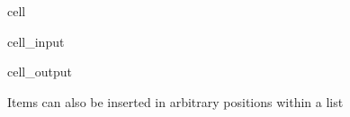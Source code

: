 \documentclass[letterpaper,10pt,english]{jupyterBook}
\begin{document}
\begin{sphinxuseclass}{cell}\begin{sphinxVerbatimInput}

\begin{sphinxuseclass}{cell_input}
\begin{sphinxVerbatim}[commandchars=\\\{\}]
  \PYG{p}{[}  \PYG{p}{]}
\end{sphinxVerbatim}

\end{sphinxuseclass}\end{sphinxVerbatimInput}
\begin{sphinxVerbatimOutput}

\begin{sphinxuseclass}{cell_output}
\begin{sphinxVerbatim}
\end{sphinxVerbatim}

\end{sphinxuseclass}\end{sphinxVerbatimOutput}

\end{sphinxuseclass}
\sphinxAtStartPar
Items can also be inserted in arbitrary positions within a list
\end{document}

